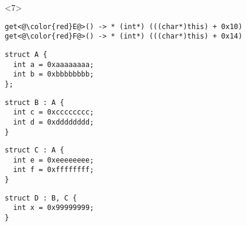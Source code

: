 \begin{frame}[fragile]
\begin{overlayarea}{\textwidth}{4cm}
\begin{onlyenv}
\begin{yesblock}
\begin{onlyenv}<7>
\begin{lstlisting}
get<@\color{red}E@>() -> * (int*) (((char*)this) + 0x10)
get<@\color{red}F@>() -> * (int*) (((char*)this) + 0x14)
\end{lstlisting}
\end{onlyenv}

\end{yesblock}
\end{onlyenv}
\end{overlayarea}


\end{frame}










\begin{frame}[fragile]
\end{frame}








\begin{frame}[fragile]
\begin{noteblock}{}
\begin{lstlisting}
struct A {
  int a = 0xaaaaaaaa;
  int b = 0xbbbbbbbb;
};
\end{lstlisting}
\end{noteblock}

\begin{twocols}
\begin{noteblock}{}
\begin{lstlisting}
struct B : A {
  int c = 0xcccccccc;
  int d = 0xdddddddd;
}
\end{lstlisting}
\end{noteblock}
\twocolssep
\begin{noteblock}{}
\begin{lstlisting}
struct C : A {
  int e = 0xeeeeeeee;
  int f = 0xffffffff;
}
\end{lstlisting}
\end{noteblock}
\end{twocols}

\begin{noteblock}{}
\begin{lstlisting}
struct D : B, C {
  int x = 0x99999999;
}
\end{lstlisting}
\end{noteblock}
\end{frame}



